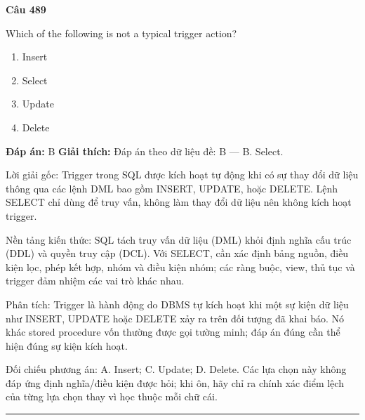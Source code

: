 \documentclass[11pt,a4paper]{article}
\newenvironment{question}[1]{%
  \par\vspace{1em}\noindent\textbf{\large Câu #1}\par\vspace{0.4em}
}{%
  \par\vspace{1em}\hrule\vspace{0.6em}
}
\newenvironment{choices}{%
  \begin{enumerate}[label=\textbf{\Alph*.},leftmargin=2.2em,itemsep=2pt,topsep=3pt]
}{%
  \end{enumerate}
}
\newcommand{\choice}{\item}
\begin{document}
\begin{question}{489}
Which of the following is not a typical trigger action?
\begin{choices}
\choice Insert
\choice Select
\choice Update
\choice Delete
\end{choices}
\textbf{Đáp án:} B
\textbf{Giải thích:} Đáp án theo dữ liệu đề: B — B. Select.

Lời giải gốc: Trigger trong SQL được kích hoạt tự động khi có sự thay đổi dữ liệu thông qua các lệnh DML bao gồm INSERT, UPDATE, hoặc DELETE. Lệnh SELECT chỉ dùng để truy vấn, không làm thay đổi dữ liệu nên không kích hoạt trigger.

Nền tảng kiến thức: SQL tách truy vấn dữ liệu (DML) khỏi định nghĩa cấu trúc (DDL) và quyền truy cập (DCL). Với SELECT, cần xác định bảng nguồn, điều kiện lọc, phép kết hợp, nhóm và điều kiện nhóm; các ràng buộc, view, thủ tục và trigger đảm nhiệm các vai trò khác nhau.

Phân tích: Trigger là hành động do DBMS tự kích hoạt khi một sự kiện dữ liệu như INSERT, UPDATE hoặc DELETE xảy ra trên đối tượng đã khai báo. Nó khác stored procedure vốn thường được gọi tường minh; đáp án đúng cần thể hiện đúng sự kiện kích hoạt.

Đối chiếu phương án: A. Insert; C. Update; D. Delete. Các lựa chọn này không đáp ứng định nghĩa/điều kiện được hỏi; khi ôn, hãy chỉ ra chính xác điểm lệch của từng lựa chọn thay vì học thuộc mỗi chữ cái.
\end{question}
\end{document}
